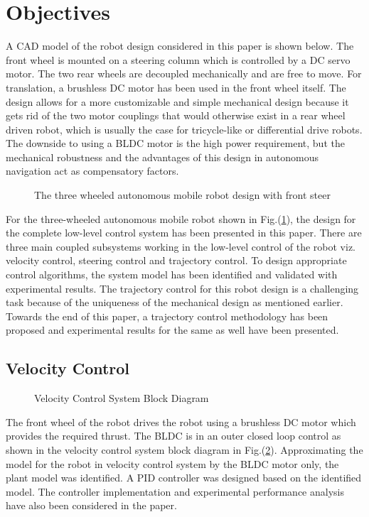 \documentclass[conference]{IEEEtran}
\begin{document}
\section{Objectives}
A CAD model of the robot design considered in this paper is shown below. The front wheel is mounted on a steering column which is controlled by a DC servo motor. The two rear wheels are decoupled mechanically and are free to move. For translation, a brushless DC motor has been used in the front wheel itself. The design allows for a more customizable and simple mechanical design because it gets rid of the two motor couplings that would otherwise exist in a rear wheel driven robot, which is usually the case for tricycle-like or differential drive robots. The downside to using a BLDC motor is the high power requirement, but the mechanical robustness and the advantages of this design in autonomous navigation act as compensatory factors. 
\begin{figure}[htbp]
 			  \centering
 			  \def\svgscale{0.25}
  			  \tiny{
  			  }
 			  \caption{The three wheeled autonomous mobile robot design with front steer}
 			 \label{robot}
 		\end{figure}
For the three-wheeled autonomous mobile robot shown in Fig.(\ref{robot}), the design for the complete low-level control system has been presented in this paper. There are three main coupled subsystems working in the low-level control of the robot viz. velocity control, steering control and trajectory control. To design appropriate control algorithms, the system model has been identified and validated with experimental results. The trajectory control for this robot design is a challenging task because of the uniqueness of the mechanical design as mentioned earlier. Towards the end of this paper, a trajectory control methodology has been proposed and experimental results for the same as well have been presented. 
\subsection{Velocity Control}

\begin{figure}[htbp]
 			  \centering
% 			  
 			  \def\svgscale{0.25}
  			  \tiny{
  			  }
 			  \caption{Velocity Control System Block Diagram}
 			 \label{veloblock}
 		\end{figure}
The front wheel of the robot drives the robot using a brushless DC motor which provides the required thrust. The BLDC is in an outer closed loop control as shown in the velocity control system block diagram in Fig.(\ref{veloblock}). Approximating the model for the robot in velocity control system by the BLDC motor only, the plant model was identified. A PID controller was designed based on the identified model. The controller implementation and experimental performance analysis have also been considered in the paper.
\end{document}
